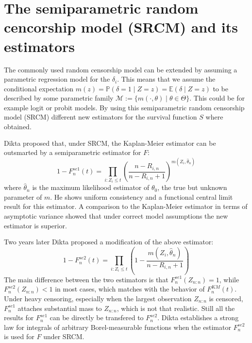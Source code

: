 \section{The semiparametric random cencorship model (SRCM) and its estimators}

The commonly used random censorship model can be extended by assuming a parametric regression model for the $\delta_i$. This means that we assume the conditional expectation $m(z) = \mathbb{P}(\delta = 1\mid Z=z) = \mathbb{E}(\delta \mid Z=z)$ to be described by some parametric family $\mathcal{M}:= \{m(\cdotp,\theta) \mid \theta \in \Theta\}$. This could be for example logit or probit models. 
By using this semiparametric random censorship model (SRCM) different new estimators for the survival function $S$ where obtained.

Dikta proposed that, under SRCM, the Kaplan-Meier estimator can be outsmarted by a semiparametric estimator for $F$:
\begin{equation}\label{fnse1}
1-F_n^{se1}(t) = \prod_{i:Z_i \leq t} \left( \frac{n-R_{i,n}}{n-R_{i,n} + 1} \right)^{m(Z_i,\hat{\theta}_n)}
\end{equation}
where $\hat{\theta}_n$ is the maximum likelihood estimator of $\theta_0$, the true but unknown parameter of $m$.
He shows uniform consistency and a functional central limit result for this estimator. A comparison to the Kaplan-Meier estimator in terms of asymptotic variance showed that under correct model assumptions the new estimator is superior\cite{PAPER2}.

Two years later Dikta proposed a modification of the above estimator:
\begin{equation}\label{fnse2}
1-F_n^{se2}(t) = \prod_{i:Z_i \leq t} \left( 1 - \frac{m(Z_i,\hat{\theta}_n)}{n-R_{i,n} + 1} \right)
\end{equation}
The main difference between the two estimators is that $F_n^{se1}(Z_{n:n}) = 1$, while $F_n^{se2}(Z_{n:n}) < 1$ in most cases, which matches with the behavior of $F_n^{KM}(t)$. Under heavy censoring, especially when the largest observation $Z_{n:n}$ is censored, $F_n^{se1}$ attaches substantial mass to $Z_{n:n}$, which is not that realistic. Still all the results for $F_n^{se1}$ can be directly be transfered to $F_n^{se2}$. 
Dikta establishes a strong law for integrals of arbitrary Borel-measurable functions when the estimator $F_n^{se2}$ is used for $F$ under SRCM\cite{PAPER3}.

